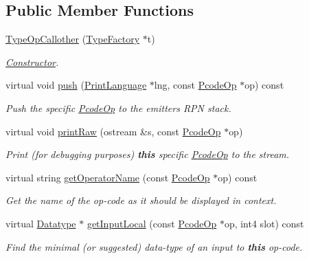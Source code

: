 \subsection*{Public Member Functions}
\begin{DoxyCompactItemize}
\item 
\mbox{\hyperlink{class_type_op_callother_a82e363673f640f6a8e5927c15f5a6dbf}{Type\+Op\+Callother}} (\mbox{\hyperlink{class_type_factory}{Type\+Factory}} $\ast$t)
\begin{DoxyCompactList}\small\item\em \mbox{\hyperlink{class_constructor}{Constructor}}. \end{DoxyCompactList}\item 
virtual void \mbox{\hyperlink{class_type_op_callother_ae5f1ef0859a04beb3efebf3a2216347b}{push}} (\mbox{\hyperlink{class_print_language}{Print\+Language}} $\ast$lng, const \mbox{\hyperlink{class_pcode_op}{Pcode\+Op}} $\ast$op) const
\begin{DoxyCompactList}\small\item\em Push the specific \mbox{\hyperlink{class_pcode_op}{Pcode\+Op}} to the emitter\textquotesingle{}s R\+PN stack. \end{DoxyCompactList}\item 
virtual void \mbox{\hyperlink{class_type_op_callother_ad663593c2bd0654a4ce68d8aa8a3b179}{print\+Raw}} (ostream \&s, const \mbox{\hyperlink{class_pcode_op}{Pcode\+Op}} $\ast$op)
\begin{DoxyCompactList}\small\item\em Print (for debugging purposes) {\bfseries{this}} specific \mbox{\hyperlink{class_pcode_op}{Pcode\+Op}} to the stream. \end{DoxyCompactList}\item 
virtual string \mbox{\hyperlink{class_type_op_callother_aec47e120502b06ef0ba27dafe286b3f8}{get\+Operator\+Name}} (const \mbox{\hyperlink{class_pcode_op}{Pcode\+Op}} $\ast$op) const
\begin{DoxyCompactList}\small\item\em Get the name of the op-\/code as it should be displayed in context. \end{DoxyCompactList}\item 
virtual \mbox{\hyperlink{class_datatype}{Datatype}} $\ast$ \mbox{\hyperlink{class_type_op_callother_a35cf8a5ffa9af239c20c60d0e1799719}{get\+Input\+Local}} (const \mbox{\hyperlink{class_pcode_op}{Pcode\+Op}} $\ast$op, int4 slot) const
\begin{DoxyCompactList}\small\item\em Find the minimal (or suggested) data-\/type of an input to {\bfseries{this}} op-\/code. \end{DoxyCompactList}\item 

\end{DoxyCompactItemize}
